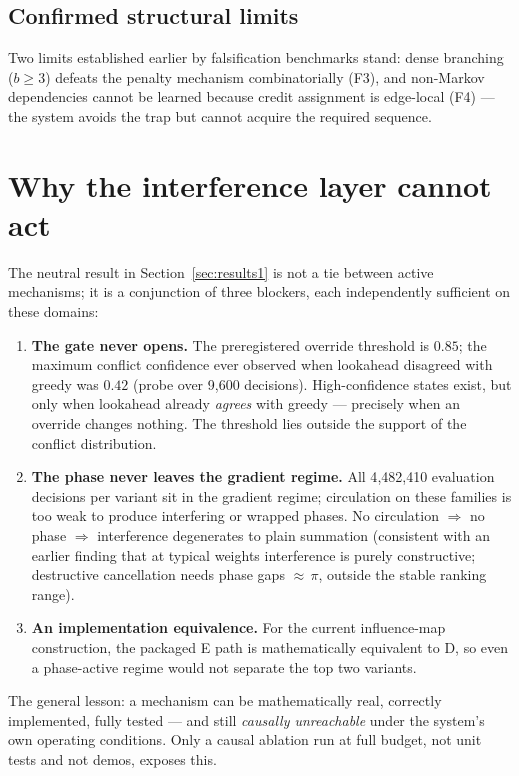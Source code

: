 \documentclass[11pt]{article}
\begin{document}
\subsection{Confirmed structural limits}

Two limits established earlier by falsification benchmarks stand: dense
branching ($b \geq 3$) defeats the penalty mechanism combinatorially (F3),
and non-Markov dependencies cannot be learned because credit assignment is
edge-local (F4) --- the system avoids the trap but cannot acquire the
required sequence.

\section{Why the interference layer cannot act}\label{sec:why}

The neutral result in Section~\ref{sec:results1} is not a tie between active
mechanisms; it is a conjunction of three blockers, each independently
sufficient on these domains:

\begin{enumerate}
  \item \textbf{The gate never opens.} The preregistered override threshold
    is $0.85$; the maximum conflict confidence ever observed when lookahead
    disagreed with greedy was $0.42$ (probe over 9{,}600 decisions).
    High-confidence states exist, but only when lookahead already
    \emph{agrees} with greedy --- precisely when an override changes
    nothing. The threshold lies outside the support of the conflict
    distribution.
  \item \textbf{The phase never leaves the gradient regime.} All
    4{,}482{,}410 evaluation decisions per variant sit in the gradient
    regime; circulation on these families is too weak to produce interfering
    or wrapped phases. No circulation $\Rightarrow$ no phase $\Rightarrow$
    interference degenerates to plain summation (consistent with an earlier
    finding that at typical weights interference is purely constructive;
    destructive cancellation needs phase gaps ${\approx}\,\pi$, outside the
    stable ranking range).
  \item \textbf{An implementation equivalence.} For the current
    influence-map construction, the packaged E path is mathematically
    equivalent to D, so even a phase-active regime would not separate the
    top two variants.
\end{enumerate}

The general lesson: a mechanism can be mathematically real, correctly
implemented, fully tested --- and still \emph{causally unreachable} under
the system's own operating conditions. Only a causal ablation run at full
budget, not unit tests and not demos, exposes this.
\end{document}
